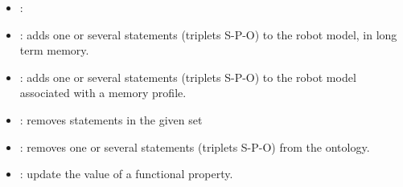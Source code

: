 \begin{itemize}
    \item {}: 

    \item {}: adds one or several statements (triplets S-P-O)
    to the robot model, in long term memory.

    \item {}: adds one or several statements
    (triplets S-P-O) to the robot model associated with a memory profile.

    \item {}: removes statements in the given set

    \item {}: removes one or several statements (triplets
    S-P-O) from the ontology.

    \item {}: update the value of a functional property.

\end{itemize}

